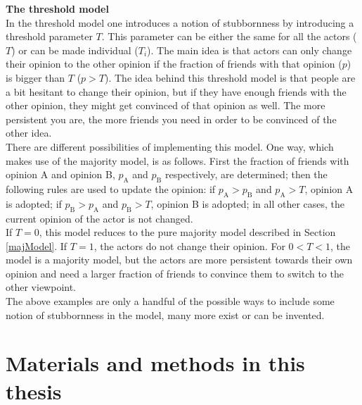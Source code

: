 \documentclass[11 pt , letterpaper , twoside , openright]{book}
\begin{document}
\newline
\textbf{The threshold model}\\
\newline
In the threshold model one introduces a notion of stubbornness by introducing a threshold parameter $T$. This parameter can be either the same for all the actors ($T$) or can be made individual ($T_i$). The main idea is that actors can only change their opinion to the other opinion if the fraction of friends with that opinion ($p$) is bigger than $T$ ($p > T$). The idea behind this threshold model is that people are a bit hesitant to change their opinion, but if they have enough friends with the other opinion, they might get convinced of that opinion as well. The more persistent you are, the more friends you need in order to be convinced of the other idea. \\
\newline
There are different possibilities of implementing this model. One way, which makes use of the majority model, is as follows. First the fraction of friends with opinion A and opinion B, $p_\text{A}$ and $p_\text{B}$ respectively, are determined; then the following rules are used to update the opinion: if $p_\text{A} > p_\text{B}$ and $p_\text{A} > T$, opinion A is adopted; if $p_\text{B} > p_\text{A}$ and $p_\text{B} > T$, opinion B is adopted; in all other cases, the current opinion of the actor is not changed.\\
\newline
If $T = 0$, this model reduces to the pure majority model described in Section \ref{majModel}. If $T = 1$, the actors do not change their opinion. For $0 < T < 1$, the model is a majority model, but the actors are more persistent towards their own opinion and need a larger fraction of friends to convince them to switch to the other viewpoint.\\
\newline
The above examples are only a handful of the possible ways to include some notion of stubbornness in the model, many more exist or can be invented.

\chapter{Materials and methods in this thesis}\label{chap4}
\end{document}
